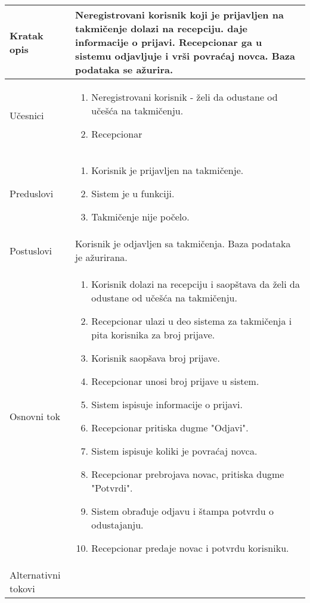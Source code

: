 \documentclass[../../main.tex]{subfiles}
\begin{document}
\begin{longtable}{| p{} | p{} |} 
\hline
    Kratak opis &  Neregistrovani korisnik koji je prijavljen na takmičenje dolazi na recepciju. daje informacije o prijavi. Recepcionar ga u sistemu odjavljuje i vrši povraćaj novca. Baza podataka se ažurira.\\ 
\hline    
    Učesnici & \begin{enumerate}
        \item Neregistrovani korisnik - želi da odustane od učešća na takmičenju. 
        \item Recepcionar
    \end{enumerate}\\
\hline
   Preduslovi & \begin{enumerate}
       \item Korisnik je prijavljen na takmičenje.
       \item Sistem je u funkciji.
       \item Takmičenje nije počelo.
   \end{enumerate}\\
\hline  
    Postuslovi & Korisnik je odjavljen sa takmičenja. Baza podataka je ažurirana.\\
\hline
    Osnovni tok & \begin{enumerate}
        \item Korisnik dolazi na recepciju i saopštava da želi da odustane od učešća na takmičenju.
        \item Recepcionar ulazi u deo sistema za takmičenja i pita korisnika za broj prijave.
        \item Korisnik saopšava broj prijave.
        \item Recepcionar unosi broj prijave u sistem. 
        \item Sistem ispisuje informacije o prijavi.
        \item Recepcionar pritiska dugme "Odjavi".
        \item Sistem ispisuje koliki je povraćaj novca. 
        \item Recepcionar prebrojava novac, pritiska dugme "Potvrdi".
        \item Sistem obrađuje odjavu i štampa potvrdu o odustajanju.
        \item Recepcionar predaje novac i potvrdu korisniku.
    \end{enumerate}\\
\hline
    Alternativni tokovi & \begin{itemize}

\end{itemize}
\end{longtable}
\end{document}
